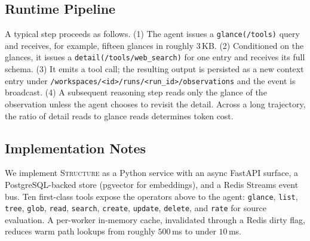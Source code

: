 \subsection{Runtime Pipeline}
\label{sec:runtime}

A typical step proceeds as follows. (1) The agent issues a
\texttt{glance(/tools)} query and receives, for example, fifteen
glances in roughly 3\,KB. (2) Conditioned on the glances, it issues a
\texttt{detail(\allowbreak/tools/web\_search)} for one entry and
receives its full schema. (3) It emits a tool call; the resulting
output is persisted as a new context entry under
\texttt{/workspaces/<id>/runs/<run\_id>/observations} and the event is
broadcast. (4) A subsequent reasoning step reads only the glance of
the observation unless the agent chooses to revisit the detail. Across
a long trajectory, the ratio of detail reads to glance reads
determines token cost.

\subsection{Implementation Notes}

We implement \textsc{Structure} as a Python service with an async
FastAPI surface, a PostgreSQL-backed store (pgvector for embeddings),
and a Redis Streams event bus. Ten first-class tools expose the
operators above to the agent: \texttt{glance}, \texttt{list},
\texttt{tree}, \texttt{glob}, \texttt{read}, \texttt{search},
\texttt{create}, \texttt{update}, \texttt{delete}, and \texttt{rate}
for source evaluation. A per-worker in-memory cache,
invalidated through a Redis dirty flag, reduces warm path lookups
from roughly $500$\,ms to under $10$\,ms.

